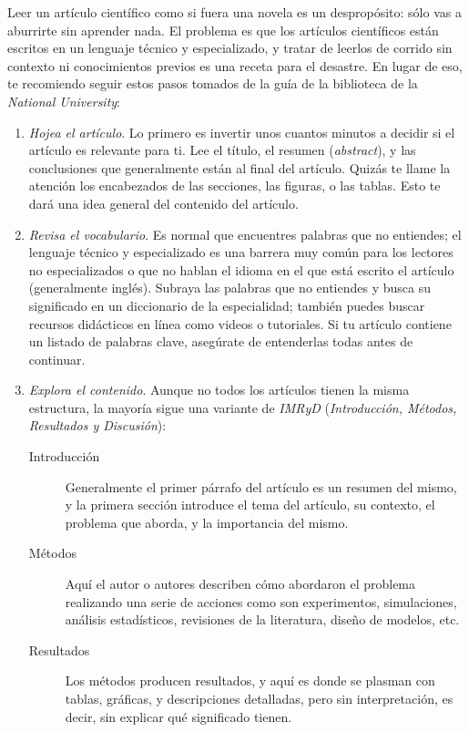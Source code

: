 Leer un artículo científico como si fuera una novela es un despropósito: sólo vas a aburrirte sin aprender nada.
El problema es que los artículos científicos están escritos en un lenguaje técnico y especializado, y tratar de leerlos de corrido sin contexto ni conocimientos previos es una receta para el desastre.
En lugar de eso, te recomiendo seguir estos pasos tomados de la guía de la biblioteca de la \emph{National University}\cite{NationalUniversity2024}:

\begin{enumerate} \item \emph{Hojea el artículo}.
	      Lo primero es invertir unos cuantos minutos a decidir si el artículo es relevante para ti.
	      Lee el título, el resumen (\emph{abstract}), y las conclusiones que generalmente están al final del artículo.
	      Quizás te llame la atención los encabezados de las secciones, las figuras, o las tablas.
	      Esto te dará una idea general del contenido del artículo.
	\item \emph{Revisa el vocabulario}.
	      Es normal que encuentres palabras que no entiendes; el lenguaje técnico y especializado es una barrera muy común para los lectores no especializados o que no hablan el idioma en el que está escrito el artículo (generalmente inglés).
	      Subraya las palabras que no entiendes y busca su significado en un diccionario de la especialidad; también puedes buscar recursos didácticos en línea como videos o tutoriales.
	      Si tu artículo contiene un listado de palabras clave, asegúrate de entenderlas todas antes de continuar.
	\item \emph{Explora el contenido}.
	      Aunque no todos los artículos tienen la misma estructura, la mayoría sigue una variante de \emph{IMRyD} (\emph{Introducción, Métodos, Resultados y Discusión}): \begin{description} \item[Introducción] Generalmente el primer párrafo del artículo es un resumen del mismo, y la primera sección introduce el tema del artículo, su contexto, el problema que aborda, y la importancia del mismo.
		      \item[Métodos] Aquí el autor o autores describen cómo abordaron el problema realizando una serie de acciones como son experimentos, simulaciones, análisis estadísticos, revisiones de la literatura, diseño de modelos, etc. \item[Resultados] Los métodos producen resultados, y aquí es donde se plasman con tablas, gráficas, y descripciones detalladas, pero sin interpretación, es decir, sin explicar qué significado tienen.

\end{description}
\end{enumerate}
